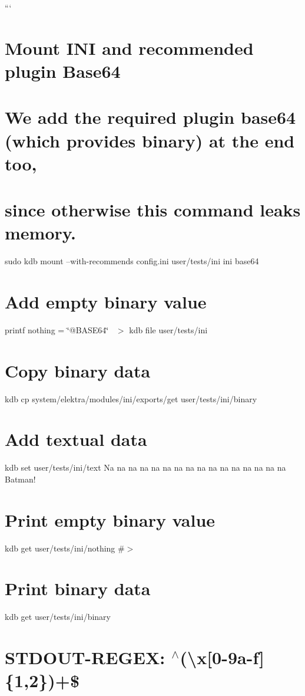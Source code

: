 ``` \section*{Mount I\+NI and recommended plugin Base64}

\section*{We add the required plugin {\ttfamily base64} (which provides {\ttfamily binary}) at the end too,}

\section*{since otherwise this command leaks memory.}

sudo kdb mount --with-\/recommends config.\+ini user/tests/ini ini base64

\section*{Add empty binary value}

printf \textquotesingle{}nothing = \char`\"{}@\+B\+A\+S\+E64\char`\"{}~\newline
\textquotesingle{} $>$ {\ttfamily kdb file user/tests/ini} \section*{Copy binary data}

kdb cp system/elektra/modules/ini/exports/get user/tests/ini/binary \section*{Add textual data}

kdb set user/tests/ini/text \textquotesingle{}Na na na na na na na na na na na na na na na na Batman!\textquotesingle{}

\section*{Print empty binary value}

kdb get user/tests/ini/nothing \#$>$

\section*{Print binary data}

kdb get user/tests/ini/binary \section*{S\+T\+D\+O\+U\+T-\/\+R\+E\+G\+EX\+: $^\wedge$(\textbackslash{}x\mbox{[}0-\/9a-\/f\mbox{]}\{1,2\})+\$}

